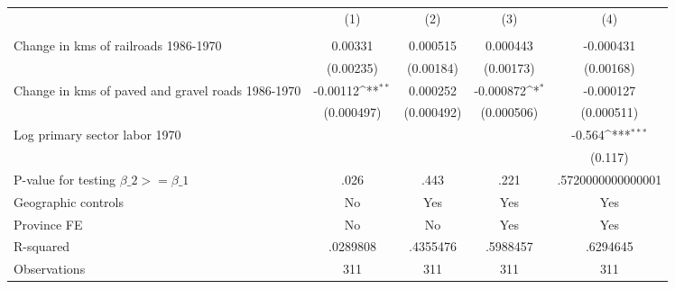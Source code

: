 {
\def\sym#1{\ifmmode^{#1}\else\(^{#1}\)\fi}
\begin{tabular}{l*{4}{c}}
\hline\hline
                &\multicolumn{1}{c}{(1)}&\multicolumn{1}{c}{(2)}&\multicolumn{1}{c}{(3)}&\multicolumn{1}{c}{(4)}\\
                &\multicolumn{1}{c}{}&\multicolumn{1}{c}{}&\multicolumn{1}{c}{}&\multicolumn{1}{c}{}\\
\hline
Change in kms of railroads 1986-1970&  0.00331         & 0.000515         & 0.000443         &-0.000431         \\
                &(0.00235)         &(0.00184)         &(0.00173)         &(0.00168)         \\
[1em]
Change in kms of paved and gravel roads 1986-1970& -0.00112\sym{**} & 0.000252         &-0.000872\sym{*}  &-0.000127         \\
                &(0.000497)         &(0.000492)         &(0.000506)         &(0.000511)         \\
[1em]
Log primary sector labor 1970&                  &                  &                  &   -0.564\sym{***}\\
                &                  &                  &                  &  (0.117)         \\
\hline
P-value for testing $\beta\_{2} >= \beta\_{1}$&     .026         &     .443         &     .221         &.5720000000000001         \\
Geographic controls&       No         &      Yes         &      Yes         &      Yes         \\
Province FE     &       No         &       No         &      Yes         &      Yes         \\
R-squared       & .0289808         & .4355476         & .5988457         & .6294645         \\
Observations    &      311         &      311         &      311         &      311         \\
\hline\hline
\end{tabular}
}
